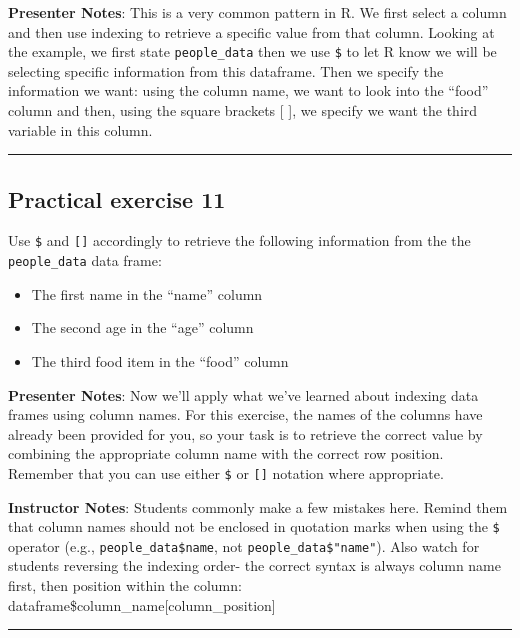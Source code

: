 \documentclass[
  letterpaper,
  DIV=11,
  numbers=noendperiod]{scrartcl}
\providecommand{\tightlist}{%
  \setlength{\itemsep}{0pt}\setlength{\parskip}{0pt}}
\begin{document}
\textbf{Presenter Notes}: This is a very common pattern in R. We first
select a column and then use indexing to retrieve a specific value from
that column. Looking at the example, we first state
\texttt{people\_data} then we use \texttt{\$} to let R know we will be
selecting specific information from this dataframe. Then we specify the
information we want: using the column name, we want to look into the
``food'' column and then, using the square brackets {[} {]}, we specify
we want the third variable in this column.

\begin{center}\rule{0.5\linewidth}{0.5pt}\end{center}

\subsection{Practical exercise 11}\label{practical-exercise-11}

Use \texttt{\$} and \texttt{{[}{]}} accordingly to retrieve the
following information from the the \texttt{people\_data} data frame:

\begin{itemize}
\tightlist
\item[$\square$]
  The first name in the ``name'' column
\item[$\square$]
  The second age in the ``age'' column
\item[$\square$]
  The third food item in the ``food'' column
\end{itemize}

\textbf{Presenter Notes}: Now we'll apply what we've learned about
indexing data frames using column names. For this exercise, the names of
the columns have already been provided for you, so your task is to
retrieve the correct value by combining the appropriate column name with
the correct row position. Remember that you can use either \texttt{\$}
or \texttt{{[}{]}} notation where appropriate.

\textbf{Instructor Notes}: Students commonly make a few mistakes here.
Remind them that column names should not be enclosed in quotation marks
when using the \texttt{\$} operator (e.g., \texttt{people\_data\$name},
not \texttt{people\_data\$"name"}). Also watch for students reversing
the indexing order- the correct syntax is always column name first, then
position within the column:
dataframe\$column\_name{[}column\_position{]}

\begin{center}\rule{0.5\linewidth}{0.5pt}\end{center}
\end{document}
